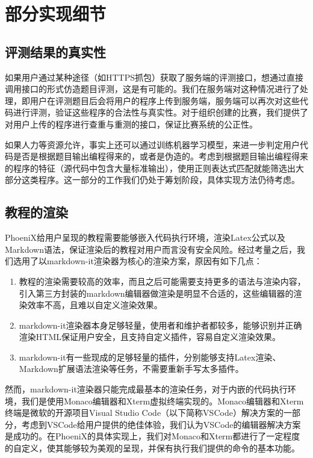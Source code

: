\chapter{部分实现细节}

\section{评测结果的真实性}

如果用户通过某种途径（如HTTPS抓包）获取了服务端的评测接口，想通过直接调用接口的形式仿造题目评测，这是有可能的。我们在服务端对这种情况进行了处理，即用户在评测题目后会将用户的程序上传到服务端，服务端可以再次对这些代码进行评测，验证这些程序的合法性与真实性。对于组织创建的比赛，我们提供了对用户上传的程序进行查重与重测的接口，保证比赛系统的公正性。

如果人力等资源允许，事实上还可以通过训练机器学习模型，来进一步判定用户代码是否是根据题目输出编程得来的，或者是伪造的。考虑到根据题目输出编程得来的程序的特征（源代码中包含大量标准输出），使用正则表达式匹配就能筛选出大部分这类程序。这一部分的工作我们仍处于筹划阶段，具体实现方法仍待考虑。

\section{教程的渲染}

PhoeniX给用户呈现的教程需要能够嵌入代码执行环境，渲染Latex公式以及Markdown语法，保证渲染后的教程对用户而言没有安全风险。经过考量之后，我们选用了以markdown-it渲染器为核心的渲染方案，原因有如下几点：

\begin{enumerate}
    \item 教程的渲染需要较高的效率，而且之后可能需要支持更多的语法与渲染内容，引入第三方封装的markdown编辑器做渲染是明显不合适的，这些编辑器的渲染效率不高，且难以自定义渲染效果。
    \item markdown-it渲染器本身足够轻量，使用者和维护者都较多，能够识别并正确渲染HTML保证用户安全，且支持自定义插件，容易自定义渲染效果。
    \item markdown-it有一些现成的足够轻量的插件，分别能够支持Latex渲染、Markdown扩展语法渲染等任务，不需要重新手写太多插件。
\end{enumerate}

然而，markdown-it渲染器只能完成最基本的渲染任务，对于内嵌的代码执行环境，我们是使用Monaco编辑器和Xterm虚拟终端实现的。Monaco编辑器和Xterm终端是微软的开源项目Visual Studio Code（以下简称VSCode）解决方案的一部分，考虑到VSCode给用户提供的绝佳体验，我们认为VSCode的编辑器解决方案是成功的。在PhoeniX的具体实现上，我们对Monaco和Xterm都进行了一定程度的自定义，使其能够较为美观的呈现，并保有执行我们提供的命令的基本功能。

